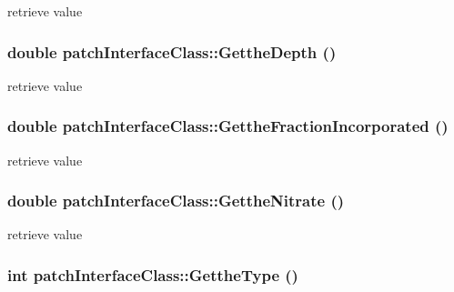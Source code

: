 retrieve value \hypertarget{classpatch_interface_class_a96efba308b79b05eee8d2545a5e446b4}{
\subsubsection[{GettheDepth}]{\setlength{\rightskip}{0pt plus 5cm}double patchInterfaceClass::GettheDepth ()}}
\label{classpatch_interface_class_a96efba308b79b05eee8d2545a5e446b4}


retrieve value \hypertarget{classpatch_interface_class_acb566078fd5c753aff6631b9a7dd5b63}{
\subsubsection[{GettheFractionIncorporated}]{\setlength{\rightskip}{0pt plus 5cm}double patchInterfaceClass::GettheFractionIncorporated ()}}
\label{classpatch_interface_class_acb566078fd5c753aff6631b9a7dd5b63}


retrieve value \hypertarget{classpatch_interface_class_a90d39b2fb7130f2631285a362fffe5b4}{
\subsubsection[{GettheNitrate}]{\setlength{\rightskip}{0pt plus 5cm}double patchInterfaceClass::GettheNitrate ()}}
\label{classpatch_interface_class_a90d39b2fb7130f2631285a362fffe5b4}


retrieve value \hypertarget{classpatch_interface_class_aa464d78a4163d8dde5b7deccd01079df}{
\subsubsection[{GettheType}]{\setlength{\rightskip}{0pt plus 5cm}int patchInterfaceClass::GettheType ()}}
\label{classpatch_interface_class_aa464d78a4163d8dde5b7deccd01079df}


